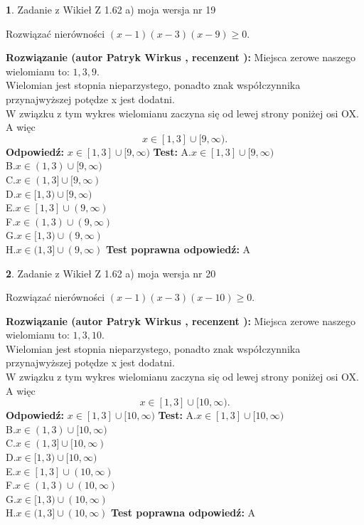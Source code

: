 \documentclass[12pt, a4paper]{article}
\theoremstyle{definition} %
\newtheorem{zad}{}
\newcommand{\zadStart}[1]{\begin{zad}#1\newline}
\newcommand{\zadStop}{\end{zad}}
\newcommand{\rozwStart}[2]{\noindent \textbf{Rozwiązanie (autor #1 , recenzent #2): }\newline}
\newcommand{\rozwStop}{\newline}
\newcommand{\odpStart}{\noindent \textbf{Odpowiedź:}\newline}
\newcommand{\odpStop}{\newline}
\newcommand{\testStart}{\noindent \textbf{Test:}\newline}
\newcommand{\testStop}{\newline}
\newcommand{\kluczStart}{\noindent \textbf{Test poprawna odpowiedź:}\newline}
\newcommand{\kluczStop}{\newline}
\begin{document}
\zadStart{Zadanie z Wikieł Z 1.62 a) moja wersja nr 19}

Rozwiązać nierówności $(x-1)(x-3)(x-9)\ge0$.
\zadStop
\rozwStart{Patryk Wirkus}{}
Miejsca zerowe naszego wielomianu to: $1, 3, 9$.\\
Wielomian jest stopnia nieparzystego, ponadto znak współczynnika przy\linebreak najwyższej potędze x jest dodatni.\\ W związku z tym wykres wielomianu zaczyna się od lewej strony poniżej osi OX. A więc $$x \in [1,3] \cup [9,\infty).$$
\rozwStop
\odpStart
$x \in [1,3] \cup [9,\infty)$
\odpStop
\testStart
A.$x \in [1,3] \cup [9,\infty)$\\
B.$x \in (1,3) \cup [9,\infty)$\\
C.$x \in (1,3] \cup [9,\infty)$\\
D.$x \in [1,3) \cup [9,\infty)$\\
E.$x \in [1,3] \cup (9,\infty)$\\
F.$x \in (1,3) \cup (9,\infty)$\\
G.$x \in [1,3) \cup (9,\infty)$\\
H.$x \in (1,3] \cup (9,\infty)$
\testStop
\kluczStart
A
\kluczStop



\zadStart{Zadanie z Wikieł Z 1.62 a) moja wersja nr 20}

Rozwiązać nierówności $(x-1)(x-3)(x-10)\ge0$.
\zadStop
\rozwStart{Patryk Wirkus}{}
Miejsca zerowe naszego wielomianu to: $1, 3, 10$.\\
Wielomian jest stopnia nieparzystego, ponadto znak współczynnika przy\linebreak najwyższej potędze x jest dodatni.\\ W związku z tym wykres wielomianu zaczyna się od lewej strony poniżej osi OX. A więc $$x \in [1,3] \cup [10,\infty).$$
\rozwStop
\odpStart
$x \in [1,3] \cup [10,\infty)$
\odpStop
\testStart
A.$x \in [1,3] \cup [10,\infty)$\\
B.$x \in (1,3) \cup [10,\infty)$\\
C.$x \in (1,3] \cup [10,\infty)$\\
D.$x \in [1,3) \cup [10,\infty)$\\
E.$x \in [1,3] \cup (10,\infty)$\\
F.$x \in (1,3) \cup (10,\infty)$\\
G.$x \in [1,3) \cup (10,\infty)$\\
H.$x \in (1,3] \cup (10,\infty)$
\testStop
\kluczStart
A
\kluczStop
\end{document}
